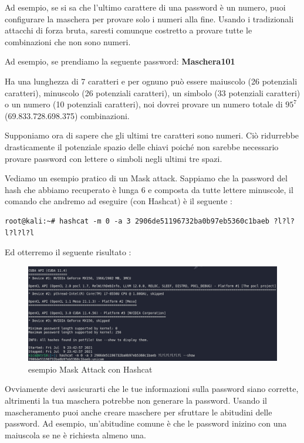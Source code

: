 Ad esempio, se si sa che l'ultimo carattere di una password è un numero, puoi configurare la maschera per provare solo i numeri alla fine. Usando i tradizionali attacchi di forza bruta, saresti comunque costretto a provare tutte le combinazioni che non sono numeri.

Ad esempio, se prendiamo la seguente password: \textbf{Maschera101}

Ha una lunghezza di 7 caratteri e per ognuno può essere maiuscolo (26 potenziali caratteri), minuscolo (26 potenziali caratteri), un simbolo (33 potenziali caratteri) o un numero (10 potenziali caratteri), noi dovrei provare un numero totale di \({95}^{7}\) (69.833.728.698.375) combinazioni.

Supponiamo ora di sapere che gli ultimi tre caratteri sono numeri. Ciò ridurrebbe drasticamente il potenziale spazio delle chiavi poiché non sarebbe necessario provare password con lettere o simboli negli ultimi tre spazi.

Vediamo un esempio pratico di un Mask attack. Sappiamo che la password del hash che abbiamo recuperato è lunga 6 e composta da tutte lettere minuscole, il comando che andremo ad eseguire (con Hashcat) è il seguente :

\begin{lstlisting}[caption={Esempio rule attack wordlist}, style=javaScriptCode]
    root@kali:~# hashcat -m 0 -a 3 2906de51196732ba0b97eb5360c1baeb ?l?l?l?l?l?l
    \end{lstlisting}

Ed otterremo il seguente risultato :

\begin{figure}[h!]
    \centering
    \includegraphics[width=\linewidth]{Immagini/1/mask.png}
    \caption{esempio Mask Attack con Hashcat}
\end{figure}

Ovviamente devi assicurarti che le tue informazioni sulla password siano corrette, altrimenti la tua maschera potrebbe non generare la password. Usando il mascheramento puoi anche creare maschere per sfruttare le abitudini delle password. Ad esempio, un'abitudine comune è che le password inizino con una maiuscola se ne è richiesta almeno una.

